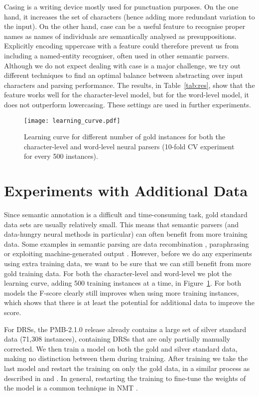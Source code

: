 \documentclass[11pt,a4paper]{article}
\begin{document}
Casing is a writing device mostly used for punctuation purposes. On the one hand, it increases the set of characters (hence adding more redundant variation to the input). On the other hand, case can be a useful feature to recognise proper names as names of individuals are semantically analysed as presuppositions.
Explicitly encoding uppercase with a feature could therefore prevent us from including a named-entity recogniser, often used in other semantic parsers. Although we do not expect dealing with case is a major challenge, we try out different techniques to find an optimal balance between abstracting over input characters and parsing performance. The results, in Table~\ref{tab:res}, show that the feature works well for the character-level model, but for the word-level model, it does not outperform lowercasing. These settings are used in further experiments. 

\begin{figure}[!t]
  \centering
  \texttt{[image: learning\_curve.pdf]}
  \caption{\label{fig:curve}Learning curve for different number of gold instances for both the character-level and word-level neural parsers (10-fold CV experiment for every 500 instances).}
\end{figure}

\section{Experiments with Additional Data}
\label{sec:exp_data}

Since semantic annotation is a difficult and time-consuming task, gold standard data sets are usually relatively small. This means that semantic parsers (and data-hungry neural methods in particular) can often benefit from more training data. Some examples in semantic parsing are data recombination \cite{data-recomb:16}, paraphrasing \cite{berant2014semantic} or exploiting machine-generated output \cite{konstas:17}. However, before we do any experiments using extra training data, we want to be sure that we can still benefit from more gold training data. For both the character-level and word-level we plot the learning curve, adding 500 training instances at a time, in Figure~\ref{fig:curve}. For both models the F-score clearly still improves when using more training instances, which shows that there is at least the potential for additional data to improve the score.

For DRSs, the PMB-2.1.0 release already contains a large set of silver standard data (71,308 instances), containing DRSs that are only partially manually corrected. 
We then train a model on both the gold and silver standard data, making no distinction between them during training. After training we take the last model and restart the training on only the gold data, in a similar process as described in  and . 
In general, restarting the training to fine-tune the weights of the model is a common technique in NMT \cite{denkowski:17}.
\end{document}
